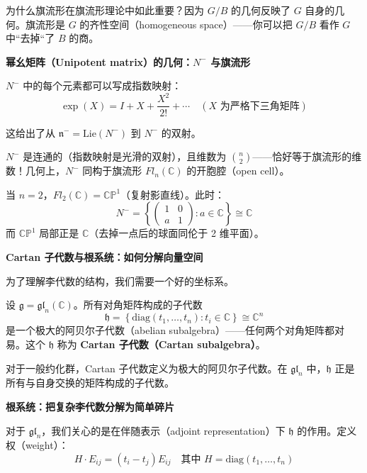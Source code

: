 为什么旗流形在旗流形理论中如此重要？因为 $G/B$ 的几何反映了 $G$ 自身的几何。旗流形是 $G$ 的齐性空间（homogeneous space）——你可以把 $G/B$ 看作 $G$ 中``去掉``了 $B$ 的商。

\bigskip
\noindent\textbf{幂幺矩阵（Unipotent matrix）的几何：$N^-$ 与旗流形}

$N^-$ 中的每个元素都可以写成指数映射：
$$\exp(X) = I + X + \frac{X^2}{2!} + \cdots \quad (X \text{ 为严格下三角矩阵})$$

这给出了从 $\mathfrak{n}^- = \text{Lie}(N^-)$ 到 $N^-$ 的双射。

$N^-$ 是连通的（指数映射是光滑的双射），且维数为 $\binom{n}{2}$——恰好等于旗流形的维数！几何上，$N^-$ 同构于旗流形 $Fl_n(\mathbb{C})$ 的开胞腔（open cell）。

\begin{Example}[$n=2$ 的情形]
当 $n=2$，$Fl_2(\mathbb{C}) = \mathbb{CP}^1$（复射影直线）。此时：
$$N^- = \left\{\begin{pmatrix} 1 & 0 \\ a & 1 \end{pmatrix} : a \in \mathbb{C}\right\} \cong \mathbb{C}$$
而 $\mathbb{CP}^1$ 局部正是 $\mathbb{C}$（去掉一点后的球面同伦于 2 维平面）。
\end{Example}

\bigskip
\noindent\textbf{Cartan 子代数与根系统：如何分解向量空间}

为了理解李代数的结构，我们需要一个好的坐标系。

\begin{Definition}
\label{def:CartanRootSystem}
设 $\mathfrak{g} = \mathfrak{gl}_n(\mathbb{C})$。所有对角矩阵构成的子代数
$$\mathfrak{h} = \left\{\mathrm{diag}(t_1, \ldots, t_n) : t_i \in \mathbb{C}\right\} \cong \mathbb{C}^n$$
是一个极大的阿贝尔子代数（abelian subalgebra）——任何两个对角矩阵都对易。这个 $\mathfrak{h}$ 称为 \textbf{Cartan 子代数（Cartan subalgebra）}。
\end{Definition}

对于一般约化群，Cartan 子代数定义为极大的阿贝尔子代数。在 $\mathfrak{gl}_n$ 中，$\mathfrak{h}$ 正是所有与自身交换的矩阵构成的子代数。

\bigskip
\noindent\textbf{根系统：把复杂李代数分解为简单碎片}

对于 $\mathfrak{gl}_n$，我们关心的是在伴随表示（adjoint representation）下 $\mathfrak{h}$ 的作用。定义权（weight）：
$$H \cdot E_{ij} = (t_i - t_j) E_{ij} \quad \text{其中 } H = \mathrm{diag}(t_1, \ldots, t_n)$$

